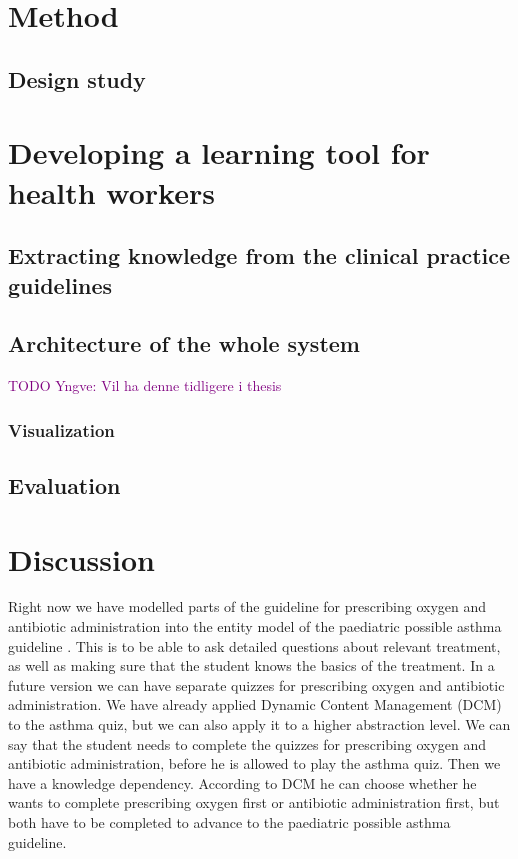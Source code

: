 \documentclass[a4paper,12pt]{book}
\begin{document}
\frontmatter


\tableofcontents
\mainmatter





\chapter{Method}
\section{Design study}




\chapter{Developing a learning tool for health workers}
\section{Extracting knowledge from the clinical  practice guidelines}








\section{Architecture of the whole system}
\textcolor{purple}{TODO Yngve: Vil ha denne tidligere i thesis}
\subsection{Visualization}
\section{Evaluation}



\chapter{Discussion}
Right now we have modelled parts of the guideline for prescribing oxygen \parencite{RepublicofKeny2016} and antibiotic administration \parencite{RepublicofKeny2016} into the entity model of the paediatric possible asthma guideline \parencite{RepublicofKeny2016}. This is to be able to ask detailed questions about relevant treatment, as well as making sure that the student knows the basics of the treatment. In a future version we can have separate quizzes for prescribing oxygen and antibiotic administration. We have already applied Dynamic Content Management (DCM) to the asthma quiz, but we can also apply it to a higher abstraction level. We can say that the student needs to complete the quizzes for prescribing oxygen and antibiotic administration, before he is allowed to play the asthma quiz. Then we have a knowledge dependency. According to DCM he can choose whether he wants to complete prescribing oxygen first or antibiotic administration first, but both have to be completed to advance to the paediatric possible asthma guideline.
\end{document}
